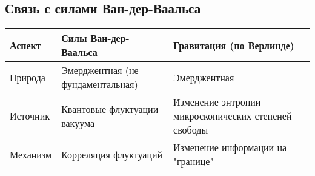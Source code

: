 \documentclass[11pt]{article}
\begin{document}
\subsection{Связь с силами
Ван-дер-Ваальса}\label{ux441ux432ux44fux437ux44c-ux441-ux441ux438ux43bux430ux43cux438-ux432ux430ux43d-ux434ux435ux440-ux432ux430ux430ux43bux44cux441ux430}

\begin{longtable}[]{@{}lll@{}}
\toprule
\begin{minipage}[b]{0.11\columnwidth}\raggedright\strut
Аспект\strut
\end{minipage} & \begin{minipage}[b]{0.32\columnwidth}\raggedright\strut
Силы Ван-дер-Ваальса\strut
\end{minipage} & \begin{minipage}[b]{0.34\columnwidth}\raggedright\strut
Гравитация (по Верлинде)\strut
\end{minipage}\tabularnewline
\midrule
\endhead
\begin{minipage}[t]{0.11\columnwidth}\raggedright\strut
Природа\strut
\end{minipage} & \begin{minipage}[t]{0.32\columnwidth}\raggedright\strut
Эмерджентная (не фундаментальная)\strut
\end{minipage} & \begin{minipage}[t]{0.34\columnwidth}\raggedright\strut
Эмерджентная\strut
\end{minipage}\tabularnewline
\begin{minipage}[t]{0.11\columnwidth}\raggedright\strut
Источник\strut
\end{minipage} & \begin{minipage}[t]{0.32\columnwidth}\raggedright\strut
Квантовые флуктуации вакуума\strut
\end{minipage} & \begin{minipage}[t]{0.34\columnwidth}\raggedright\strut
Изменение энтропии микроскопических степеней свободы\strut
\end{minipage}\tabularnewline
\begin{minipage}[t]{0.11\columnwidth}\raggedright\strut
Механизм\strut
\end{minipage} & \begin{minipage}[t]{0.32\columnwidth}\raggedright\strut
Корреляция флуктуаций\strut
\end{minipage} & \begin{minipage}[t]{0.34\columnwidth}\raggedright\strut
Изменение информации на "границе"\strut

\end{minipage}
\end{longtable}
\end{document}
